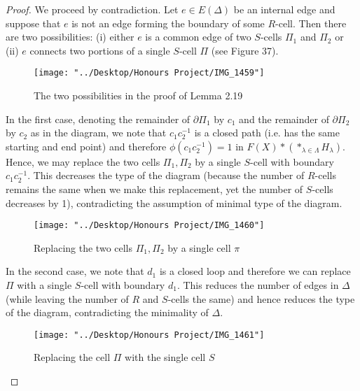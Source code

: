 \documentclass[12pt]{article}
\newcommand{\vs}{\vskip10pt}
\begin{document}
	\begin{proof}
		
		We proceed by contradiction. Let $e \in E(\Delta)$ be an internal edge and suppose that $e$ is not an edge forming the boundary of some $R$-cell. Then there are two possibilities: (i) either $e$ is a common edge of two $S$-cells $\Pi_1$ and $\Pi_2$ or (ii) $e$ connects two portions of a single $S$-cell $\Pi$ (see Figure 37). 
		
		
\begin{figure} [H]
	\centering
	\texttt{[image: "../Desktop/Honours Project/IMG\_1459"]}
	\caption{The two possibilities in the proof of Lemma 2.19}
	\label{fig:img1459}
\end{figure}

		
		\vs 
		
		In the first case, denoting the remainder of $\partial \Pi_1$ by $c_1$ and the remainder of $\partial \Pi_2$ by $c_2$ as in the diagram, we note that $c_1 c_2^{-1}$ is a closed path (i.e. has the same starting and end point) and therefore $\phi(c_1c_2^{-1}) = 1$ in $F(X) * (*_{\lambda \in \Lambda} H_\lambda)$. Hence, we may replace the two cells $\Pi_1, \Pi_2$ by a single $S$-cell with boundary $c_1 c_2^{-1}$. This decreases the type of the diagram (because the number of $R$-cells remains the same when we make this replacement, yet the number of $S$-cells decreases by 1), contradicting the assumption of minimal type of the diagram. 
		
		\begin{figure} [H]
			\centering
			\texttt{[image: "../Desktop/Honours Project/IMG\_1460"]}
			\caption{Replacing the two cells $\Pi_1, \Pi_2$ by a single cell $\pi$}
			\label{fig:img1460}
		\end{figure}
		
		\vs 
		
		In the second case, we note that $d_1$ is a closed loop and therefore we can replace $\Pi$ with a single $S$-cell with boundary $d_1$. This reduces the number of edges in $\Delta$ (while leaving the number of $R$ and $S$-cells the same) and hence reduces the type of the diagram, contradicting the minimality of $\Delta$.
		
\begin{figure} [H]
	\centering
	\texttt{[image: "../Desktop/Honours Project/IMG\_1461"]}
	\caption{Replacing the cell $\Pi$ with the single cell $S$}
	\label{fig:img1461}
\end{figure}
		
	\end{proof}
\end{document}
